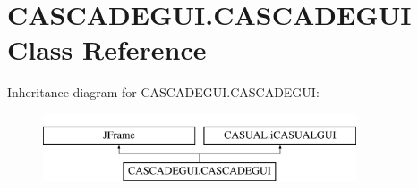\hypertarget{classCASCADEGUI_1_1CASCADEGUI}{\section{C\-A\-S\-C\-A\-D\-E\-G\-U\-I.\-C\-A\-S\-C\-A\-D\-E\-G\-U\-I Class Reference}
\label{classCASCADEGUI_1_1CASCADEGUI}
}
Inheritance diagram for C\-A\-S\-C\-A\-D\-E\-G\-U\-I.\-C\-A\-S\-C\-A\-D\-E\-G\-U\-I\-:\begin{figure}[H]
\begin{center}
\leavevmode
\includegraphics[height=2.000000cm]{classCASCADEGUI_1_1CASCADEGUI}
\end{center}
\end{figure}
